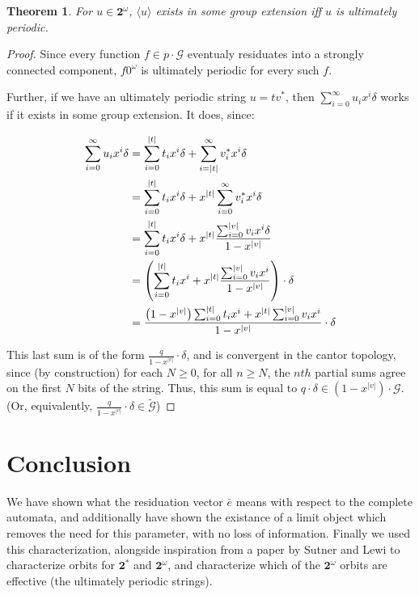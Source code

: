 \documentclass[12pt]{article}
\newcommand{\G}{\mathcal{G}}
\newcommand{\2}{\textbf{2}}
\newcommand{\e}{\bar{e}}
\newtheorem{thm}{Theorem}
\begin{document}
\begin{thm}
  For $u \in \2^\omega$, $\langle u \rangle$ exists in some group extension
  iff $u$ is ultimately periodic.
\end{thm}

\begin{proof}
  Since every function $f \in p \cdot \G$ eventualy residuates into a 
  strongly connected component, $f 0^\omega$ is ultimately periodic for
  every such $f$.

  Further, if we have an ultimately periodic string $u = tv^*$, then
  $\sum_{i=0}^{\infty} u_i x^i \delta$ works if it exists in some group 
  extension. It does, since:

  \begin{align*}
    \sum_{i=0}^{\infty} u_i x^i \delta 
    &= \sum_{i=0}^{|t|} t_i x^i \delta 
        + \sum_{i=|t|}^{\infty} v^*_i x^i \delta\\
    &= \sum_{i=0}^{|t|} t_i x^i \delta 
        + x^{|t|} \sum_{i=0}^{\infty} v^*_i x^i \delta\\
    &= \sum_{i=0}^{|t|} t_i x^i \delta 
         + x^{|t|} \frac{\sum_{i=0}^{|v|} v_i x^i \delta}{1 - x^{|v|}}\\
    &= \left ( 
        \sum_{i=0}^{|t|} t_i x^i
        + x^{|t|} \frac{\sum_{i=0}^{|v|} v_i x^i}{1 - x^{|v|}}
       \right ) \cdot \delta\\
    &= \frac%
        {%
          \left ( 1 - x^{|v|} \right ) \sum_{i=0}^{|t|} t_i x^i + 
          x^{|t|} \sum_{i=0}^{|v|} v_i x^i
        }
        {1 - x^{|v|}}
       \cdot \delta\\
  \end{align*}

  This last sum is of the form $\frac{q}{1 - x^{|v|}} \cdot \delta$, 
  and is convergent in the cantor topology, since (by construction)
  for each $N \geq 0$, for all $n \geq N$, the $nth$ partial sums 
  agree on the first $N$ bits of the string.
  Thus, this sum is equal to $q \cdot \delta \in (1 - x^{|v|}) \cdot \G$.
  (Or, equivalently, $\frac{q}{1 - x^{|v|}} \cdot \delta \in \widetilde{\G}$)
\end{proof}

\section{Conclusion}
We have shown what the residuation vector $\e$ means with respect to the
complete automata, and additionally have shown the existance of a limit
object which removes the need for this parameter, with no loss of information.
Finally we used this characterization, alongside inspiration from a paper
by Sutner and Lewi \cite{SutnerLewi12:iter_inver_bin_trans} to characterize
orbits for $\2^*$ and $\2^\omega$, and characterize which of the $\2^\omega$
orbits are effective (the ultimately periodic strings).
\end{document}
